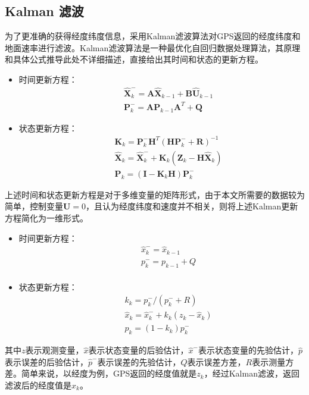 \documentclass[a4paper, 12pt]{article}
\begin{document}
\subsection{Kalman 滤波}
为了更准确的获得经度纬度信息，采用Kalman滤波算法对GPS返回的经度纬度和地面速率进行滤波。Kalman滤波算法是一种最优化自回归数据处理算法，其原理和具体公式推导此处不详细描述，直接给出其时间和状态的更新方程。
\begin{itemize}
\item 时间更新方程：
  \begin{eqnarray}
    \label{eq:1}
    &&\hat{\mathbf{X}}_k^- = \mathbf{A}\hat{\mathbf{X}}_{k-1} + \mathbf{B}\hat{\mathbf{U}}_{k-1}\\
    &&\mathbf{P}_k^- = \mathbf{A}\mathbf{P}_{k-1}\mathbf{A}^T + \mathbf{Q}
  \end{eqnarray}
\item 状态更新方程：
  \begin{eqnarray}
    \label{eq:2}
    &&\mathbf{K}_k = \mathbf{P}_k^-\mathbf{H}^T(\mathbf{H}\mathbf{P}_k^- + \mathbf{R})^{-1}\\
    &&\hat{\mathbf{X}}_k = \hat{\mathbf{X}}_k^- + \mathbf{K}_k(\mathbf{Z}_k-\mathbf{H}\hat{\mathbf{X}}_k)\\
    &&\mathbf{P}_k = (\mathbf{I} - \mathbf{K}_k\mathbf{H})\mathbf{P}_k^-
  \end{eqnarray}
\end{itemize}
上述时间和状态更新方程是对于多维变量的矩阵形式，由于本文所需要的数据较为简单，控制变量$\mathbf{U}=0$，且认为经度纬度和速度并不相关，则将上述Kalman更新方程简化为一维形式。
\begin{itemize}
\item 时间更新方程：
  \begin{eqnarray}
    \label{eq:3}
    &&\hat{x}_k^- = \hat{x}_{k-1}\\
    &&p_k^- = p_{k-1} + Q\\
  \end{eqnarray}
\item 状态更新方程：
  \begin{eqnarray}
    \label{eq:4}
    && k_k = p_k^-/(p_k^- + R)\\
    &&\hat{x}_k = \hat{x}_k^-+k_k(z_k-\hat{x}_k)\\
    &&p_k = (1-k_k)p_k^-
  \end{eqnarray}
\end{itemize}
其中$z$表示观测变量，$\hat{x}$表示状态变量的后验估计，$\hat{x}^-$表示状态变量的先验估计，$\hat{p}$表示误差的后验估计，$\hat{p}^-$表示误差的先验估计，$Q$表示误差方差，$R$表示测量方差。简单来说，以经度为例，GPS返回的经度值就是$z_k$，经过Kalman滤波，返回滤波后的经度值是$\hat{x}_k$。
\end{document}
